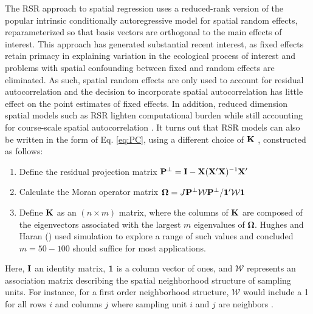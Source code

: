 \documentclass[12pt,fleqn]{article}
\begin{document}
\begin{flushleft}
The RSR approach to spatial regression uses a reduced-rank version of the popular intrinsic conditionally autoregressive \citep[ICAR;][]{Besag1995,Rue2005} model for spatial random effects, reparameterized so that basis vectors are orthogonal to the main effects of interest.  This approach has generated substantial recent interest, as fixed effects retain primacy in explaining variation in the ecological process of interest and problems with spatial confounding between fixed and random effects are eliminated. As such, spatial random effects are only used to account for residual autocorrelation \citep{Reich2006,Hodges2010} and the decision to incorporate spatial autocorrelation has little effect on the point estimates of fixed effects.  In addition, reduced dimension spatial models such as RSR lighten computational burden while still accounting for course-scale spatial autocorrelation \citep[see e.g.][]{LatimerEtAl2009,Wikle2010,Hughes2013}.  It turns out that RSR models can also be written in the form of Eq. \ref{eq:PC}, using a
different choice of ${\bf K}$ \citep{Hughes2013}, constructed as follows:
\begin{enumerate}
  \item Define the residual projection matrix ${\bf P}^\perp={\bf I}-{\bf X}({\bf X}^\prime{\bf X})^{-1}{\bf X}^\prime$
  \item Calculate the Moran operator matrix $\boldsymbol{\Omega}=J{\bf P}^\perp \mathcal{W}{\bf P}^\perp/{\bf 1}^\prime \mathcal{W} {\bf 1}$
  \item Define ${\bf K}$ as an $(n \times m)$ matrix, where the columns of ${\bf K}$ are composed of the eigenvectors  associated with the largest $m$ eigenvalues of $\boldsymbol{\Omega}$. Hughes and Haran (\citeyear{Hughes2013}) used simulation to explore a range of such values and concluded $m=50-100$ should suffice for most applications.
\end{enumerate}
Here, ${\bf I}$ an identity matrix, ${\bf 1}$ is a column vector of ones, and $\mathcal{W}$ represents an association matrix describing the spatial neighborhood structure of sampling units.  For instance, for a first order neighborhood structure, $\mathcal{W}$ would include a 1 for all rows $i$ and columns $j$ where sampling unit $i$ and $j$ are neighbors \citep[see][for alternative association matrices]{Rue2005}.

\renewcommand{\refname}{Literature Cited}




\end{flushleft}
\end{document}

